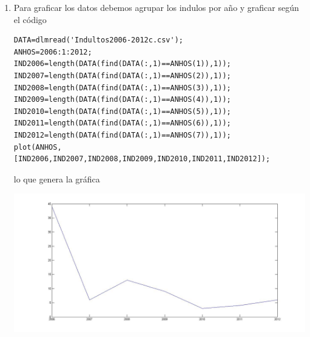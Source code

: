 \documentclass[11pt]{article}
\begin{document}
\begin{enumerate}
\begin{enumerate}
\begin{verbatim}
2011,M,24,ROBO CON INTIMIDACION,RAZONES HUMANITARIAS 
2011,M,43,TRAFICO ILICITO DE ESTUPEFACIENTES,RAZONES HUMANITARIAS 
2012,M,52,LESIONES GRAVES EN CONTEXTO DE VIOLENCIA INTRAFAMILIAR (2),RAZONES HUMANITARIAS 
2012,F,29,ABANDONO DE MENOR DE DIEZ ANHOS EN LUGAR SOLITARIO,
2012,M,59,HOMICIDIO CALIFICADO + AMENAZAS NO CONDICIONALES,RAZONES HUMANITARIAS
2012,M,21,ROBO CON VIOLENCIA,RAZONES HUMANITARIAS
2012,M,70,TRAFICO ILICITO DE ESTUPEFACIENTES,RAZONES HUMANITARIAS
2012,M,53,TRAFICO ILICITO DE ESTUPEFACIENTES,RAZONES HUMANITARIAS
\end{verbatim}
el cual no se puede leer con \texttt{dlmread()} puesto contiene car\'acteres que no son n\'umeros. Lo modificamos elminando su primera fila y  segunda  y\'ultima columna.
\begin{verbatim}
2006;26
2006;35
2006;47
2006;42
2006;31
2006;32
2006;39
2006;50
2006;24
2006;46
2006;58
2006;55
2006;53
2006;34
2006;46
2006;49
2006;28
2006;56
2006;72
2006;50
2006;39
2006;48
2006;42
2006;30
2006;65
2006;29
2006;57
2006;50
2006;58
2006;46
2006;37
2006;36
2006;56
2006;45
2006;56
2006;33
2006;31
2006;43
2006;28
2007;69
2007;38
2007;50
2007;38
2007;49
2007;55
2008;30
2008;42
2008;30
2008;29
2008;61
2008;71
2008;37
2008;25
2008;24
2008;42
2008;33
2008;53
2008;25
2009;44
2009;54
2009;45
2009;55
2009;54
2009;49
2009;56
2009;67
2009;29
2010;36
2010;32
2010;65
2011;62
2011;43
2011;24
2011;43
2012;52
2012;29
2012;59
2012;21
2012;70
2012;53
\end{verbatim}
luego ejecutamos su lectura con el c\'odigo 
\begin{lstlisting}
DATA=dlmread('Indultos2006-2012c.csv');
\end{lstlisting}
\item Para graficar los datos debemos agrupar los indulos por año y graficar seg\'un el c\'odigo
\begin{lstlisting}
DATA=dlmread('Indultos2006-2012c.csv');
ANHOS=2006:1:2012;
IND2006=length(DATA(find(DATA(:,1)==ANHOS(1)),1));
IND2007=length(DATA(find(DATA(:,1)==ANHOS(2)),1));
IND2008=length(DATA(find(DATA(:,1)==ANHOS(3)),1));
IND2009=length(DATA(find(DATA(:,1)==ANHOS(4)),1));
IND2010=length(DATA(find(DATA(:,1)==ANHOS(5)),1));
IND2011=length(DATA(find(DATA(:,1)==ANHOS(6)),1));
IND2012=length(DATA(find(DATA(:,1)==ANHOS(7)),1));
plot(ANHOS,[IND2006,IND2007,IND2008,IND2009,IND2010,IND2011,IND2012]);
\end{lstlisting}
lo que genera la gr\'afica

\includegraphics[width=\textwidth]{indultosporanho.jpg}



\end{enumerate}
\end{enumerate}
\end{document}
